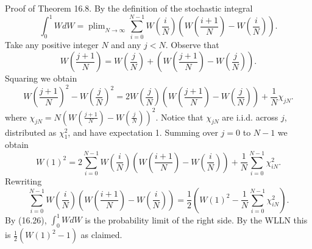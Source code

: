 \documentclass[10pt]{article}
\begin{document}
Proof of Theorem 16.8. By the definition of the stochastic integral
$$
\int_{0}^{1} W d W=\operatorname{plim}_{N \rightarrow \infty} \sum_{i=0}^{N-1} W\left(\frac{i}{N}\right)\left(W\left(\frac{i+1}{N}\right)-W\left(\frac{i}{N}\right)\right) .
$$
Take any positive integer $N$ and any $j<N$. Observe that
$$
W\left(\frac{j+1}{N}\right)=W\left(\frac{j}{N}\right)+\left(W\left(\frac{j+1}{N}\right)-W\left(\frac{j}{N}\right)\right) .
$$
Squaring we obtain
$$
W\left(\frac{j+1}{N}\right)^{2}-W\left(\frac{j}{N}\right)^{2}=2 W\left(\frac{j}{N}\right)\left(W\left(\frac{j+1}{N}\right)-W\left(\frac{j}{N}\right)\right)+\frac{1}{N} \chi_{j N} .
$$
where $\chi_{j N}=N\left(W\left(\frac{j+1}{N}\right)-W\left(\frac{j}{N}\right)\right)^{2}$. Notice that $\chi_{j N}$ are i.i.d. across $j$, distributed as $\chi_{1}^{2}$, and have expectation 1. Summing over $j=0$ to $N-1$ we obtain
$$
W(1)^{2}=2 \sum_{i=0}^{N-1} W\left(\frac{i}{N}\right)\left(W\left(\frac{i+1}{N}\right)-W\left(\frac{i}{N}\right)\right)+\frac{1}{N} \sum_{i=0}^{N-1} \chi_{i N}^{2} .
$$
Rewriting
$$
\sum_{i=0}^{N-1} W\left(\frac{i}{N}\right)\left(W\left(\frac{i+1}{N}\right)-W\left(\frac{i}{N}\right)\right)=\frac{1}{2}\left(W(1)^{2}-\frac{1}{N} \sum_{i=0}^{N-1} \chi_{i N}^{2}\right) .
$$
By (16.26), $\int_{0}^{1} W d W$ is the probability limit of the right side. By the WLLN this is $\frac{1}{2}\left(W(1)^{2}-1\right)$ as claimed.
\end{document}
